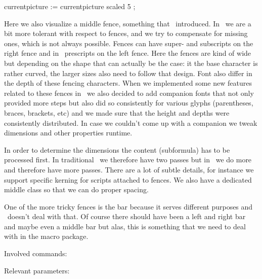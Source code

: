     currentpicture := currentpicture scaled 5 ;
\stopMPcode
\stoplinecorrection

Here we also visualize a middle fence, something that \ETEX\ introduced. In
\LUAMETATEX\ we are a bit more tolerant with respect to fences, and we try to
compensate for missing ones, which is not always possible. Fences can have super-
and subscripts on the right fence and in \LUAMETATEX\ prescripts on the left
fence. Here the fences are kind of wide but depending on the shape that can
actually be the case: it the base character is rather curved, the larger sizes
also need to follow that design. Font also differ in the depth of these fencing
characters. When we implemented some new features related to these fences in
\CONTEXT\ we also decided to add companion fonts that not only provided more
steps but also did so consistently for various glyphs (parentheses, braces,
brackets, etc) and we made sure that the height and depths were consistently
distributed. In case we couldn't come up with a companion we tweak dimensions and
other properties runtime.

In order to determine the dimensions the content (subformula) has to be processed
first. In traditional \TEX\ we therefore have two passes but in \LUAMETATEX\ we
do more and therefore have more passes. There are a lot of subtle details, for
instance we support specific kerning for scripts attached to fences. We also have
a dedicated middle class so that we can do proper spacing.

One of the more tricky fences is the bar because it serves different purposes and
\UNICODE\ doesn't deal with that. Of course there should have been a left and
right bar and maybe even a middle bar but alas, this is something that we need to
deal with in the macro package.

Involved commands:

\starttyping
\Uleft
\Uright
\Umiddle
\Uoperator
\Uvextensible
\stoptyping

Relevant parameters:

\starttyping
\Umathfractionrule
\Umathoperatorsize
\Umathdelimitershortfall
\Umathdelimiterpercent
\stoptyping

\stopsection

\stopdocument


